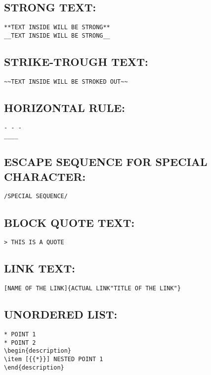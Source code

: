 \documentclass[10pt]{article}
\begin{document}
\subsection{STRONG TEXT:}
\begin{verbatim}
**TEXT INSIDE WILL BE STRONG**
__TEXT INSIDE WILL BE STRONG__
\end{verbatim}

\subsection{STRIKE-TROUGH TEXT:}
\begin{verbatim}
~~TEXT INSIDE WILL BE STROKED OUT~~
\end{verbatim}

\subsection{HORIZONTAL RULE:}
\begin{verbatim}
- - -
____
\end{verbatim}

\subsection{ESCAPE SEQUENCE FOR SPECIAL CHARACTER:}
\begin{verbatim}
/SPECIAL SEQUENCE/
\end{verbatim}

\subsection{BLOCK QUOTE TEXT:}
\begin{verbatim}
> THIS IS A QUOTE
\end{verbatim}

\subsection{LINK TEXT:}
\begin{verbatim}
[NAME OF THE LINK]{ACTUAL LINK"TITLE OF THE LINK"}
\end{verbatim}

\subsection{UNORDERED LIST:}
\begin{verbatim}
* POINT 1
* POINT 2
\begin{description}
\item [{{*}}] NESTED POINT 1
\end{description}
\end{verbatim}
\end{document}
